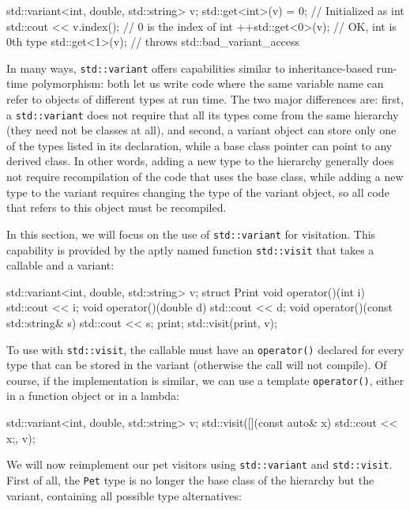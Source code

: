 \begin{code}
std::variant<int, double, std::string> v;
std::get<int>(v) = 0;     // Initialized as int
std::cout << v.index();     // 0 is the index of int
++std::get<0>(v);     // OK, int is 0th type
std::get<1>(v);          // throws std::bad_variant_access
\end{code}

In many ways, \texttt{std::variant} offers capabilities similar to inheritance-based run-time polymorphism: both let us write code where the same variable name can refer to objects of different types at run time. The two major differences are: first, a \texttt{std::variant} does not require that all its types come from the same hierarchy (they need not be classes at all), and second, a variant object can store only one of the types listed in its declaration, while a base class pointer can point to any derived class. In other words, adding a new type to the hierarchy generally does not require recompilation of the code that uses the base class, while adding a new type to the variant requires changing the type of the variant object, so all code that refers to this object must be recompiled.

In this section, we will focus on the use of \texttt{std::variant} for visitation. This capability is provided by the aptly named function \texttt{std::visit} that takes a callable and a variant:

\begin{code}
std::variant<int, double, std::string> v;
struct Print {
  void operator()(int i) { std::cout << i; }
  void operator()(double d) { std::cout << d; }
  void operator()(const std::string& s) { std::cout << s; }
} print;
std::visit(print, v);
\end{code}

To use with \texttt{std::visit}, the callable must have an \texttt{operator()} declared for every type that can be stored in the variant (otherwise the call will not compile). Of course, if the implementation is similar, we can use a template \texttt{operator()}, either in a function object or in a lambda:

\begin{code}
std::variant<int, double, std::string> v;
std::visit([](const auto& x) { std::cout << x;}, v);
\end{code}

We will now reimplement our pet visitors using \texttt{std::variant} and \texttt{std::visit}. First of all, the \texttt{Pet} type is no longer the base class of the hierarchy but the variant, containing all possible type alternatives:


